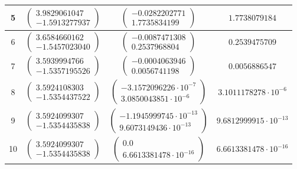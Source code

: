 \documentclass{article}
\begin{document}
\begin{table}[htb]
\begin{tabular}{|c|c|c|c|}
        5  & $\begin{pmatrix} 3.9829061047 \\ -1.5913277937 \end{pmatrix}$ & $\begin{pmatrix} -0.0282202771               \\ 1.7735834199               \end{pmatrix}$ & $ 1.7738079184 $               \\ \hline
        6  & $\begin{pmatrix} 3.6584660162 \\ -1.5457023040 \end{pmatrix}$ & $\begin{pmatrix} -0.0087471308               \\ 0.2537968804               \end{pmatrix}$ & $ 0.2539475709 $               \\ \hline
        7  & $\begin{pmatrix} 3.5939994766 \\ -1.5357195526 \end{pmatrix}$ & $\begin{pmatrix} -0.0004063946               \\ 0.0056741198               \end{pmatrix}$ & $ 0.0056886547 $               \\ \hline
        8  & $\begin{pmatrix} 3.5924108303 \\ -1.5354437522 \end{pmatrix}$ & $\begin{pmatrix} -3.1572096226\cdot 10^{-7}  \\ 3.0850043851\cdot 10^{-6}  \end{pmatrix}$ & $ 3.1011178278\cdot 10^{-6}$   \\ \hline
        9  & $\begin{pmatrix} 3.5924099307 \\ -1.5354435838 \end{pmatrix}$ & $\begin{pmatrix} -1.1945999745\cdot 10^{-13} \\ 9.6073149436\cdot 10^{-13} \end{pmatrix}$ & $ 9.6812999915\cdot 10^{-13} $ \\ \hline
        10 & $\begin{pmatrix} 3.5924099307 \\ -1.5354435838 \end{pmatrix}$ & $\begin{pmatrix} 0.0                         \\ 6.6613381478\cdot 10^{-16} \end{pmatrix}$ & $ 6.6613381478\cdot 10^{-16} $ \\ \hline
      \end{tabular}
    \end{table}
\end{document}
